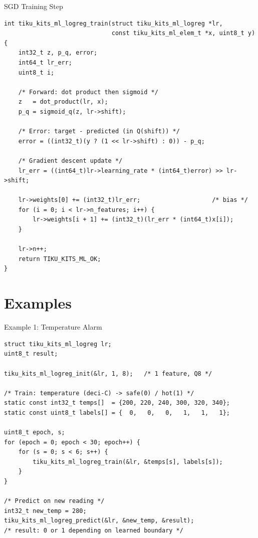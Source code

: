 \documentclass[aspectratio=169, 10pt]{beamer}
\begin{document}
\begin{frame}[fragile]{SGD Training Step}
\begin{lstlisting}[style=cstyle,
  title={tiku\_kits\_ml\_logreg.c --- train}]
int tiku_kits_ml_logreg_train(struct tiku_kits_ml_logreg *lr,
                              const tiku_kits_ml_elem_t *x, uint8_t y)
{
    int32_t z, p_q, error;
    int64_t lr_err;
    uint8_t i;

    /* Forward: dot product then sigmoid */
    z   = dot_product(lr, x);
    p_q = sigmoid_q(z, lr->shift);

    /* Error: target - predicted (in Q(shift)) */
    error = ((int32_t)(y ? (1 << lr->shift) : 0)) - p_q;

    /* Gradient descent update */
    lr_err = ((int64_t)lr->learning_rate * (int64_t)error) >> lr->shift;

    lr->weights[0] += (int32_t)lr_err;                    /* bias */
    for (i = 0; i < lr->n_features; i++) {
        lr->weights[i + 1] += (int32_t)(lr_err * (int64_t)x[i]);
    }

    lr->n++;
    return TIKU_KITS_ML_OK;
}
\end{lstlisting}
\end{frame}

\section{Examples}

\begin{frame}[fragile]{Example 1: Temperature Alarm}
\begin{lstlisting}[style=cstyle,
  title={examples/example\_ml\_logreg.c --- classify hot vs. safe}]
struct tiku_kits_ml_logreg lr;
uint8_t result;

tiku_kits_ml_logreg_init(&lr, 1, 8);   /* 1 feature, Q8 */

/* Train: temperature (deci-C) -> safe(0) / hot(1) */
static const int32_t temps[]  = {200, 220, 240, 300, 320, 340};
static const uint8_t labels[] = {  0,   0,   0,   1,   1,   1};

uint8_t epoch, s;
for (epoch = 0; epoch < 30; epoch++) {
    for (s = 0; s < 6; s++) {
        tiku_kits_ml_logreg_train(&lr, &temps[s], labels[s]);
    }
}

/* Predict on new reading */
int32_t new_temp = 280;
tiku_kits_ml_logreg_predict(&lr, &new_temp, &result);
/* result: 0 or 1 depending on learned boundary */
\end{lstlisting}
\end{frame}
\end{document}
